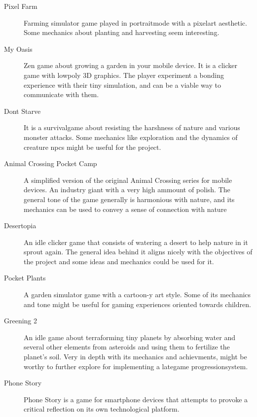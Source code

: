 \begin{description}

\item[Pixel Farm]{Farming simulator game played in \gls{portraitmode} with a \gls{pixelart}
aesthetic. Some mechanics about planting and harvesting seem interesting.}
\item[My Oasis]{Zen game about growing a garden in your mobile device. It is a \gls{clicker} game with \gls{lowpoly} 3D graphics. The player experiment a bonding experience with their tiny simulation, and can be a viable way to communicate with them.}

\item[Dont Starve]{It is a \gls{survivalgame} about resisting the harshness of nature and various monster attacks. Some mechanics like exploration and the dynamics of creature \glspl{npc} might be useful for the project.}

\item[Animal Crossing Pocket Camp]{A simplified version of the original Animal Crossing series for mobile devices. An industry giant with a very high ammount of polish. The general tone of the game generally is harmonious with nature, and its mechanics can be used to convey a sense of connection with nature}

\item[Desertopia]{An \gls{idle} \gls{clicker} game that consists of watering a desert to help nature in it sprout again. The general idea behind it aligns nicely with the objectives of the project and some ideas and mechanics could be used for it.}

\item[Pocket Plants]{A garden simulator game with a cartoon-y art style. Some of its mechanics and tone might be useful for gaming experiences oriented towards children.}

\item[Greening 2]{An \gls{idle} game about terraforming tiny planets by absorbing water and several other elements from asteroids and using them to fertilize the planet's soil. Very in depth with its mechanics and achievments, might be worthy to further explore for implementing a \gls{lategame} \gls{progressionsystem}.}

\item[Phone Story]{Phone Story is a game for smartphone devices that attempts to provoke a 
	critical reflection on its own technological platform.}
\end{description}

